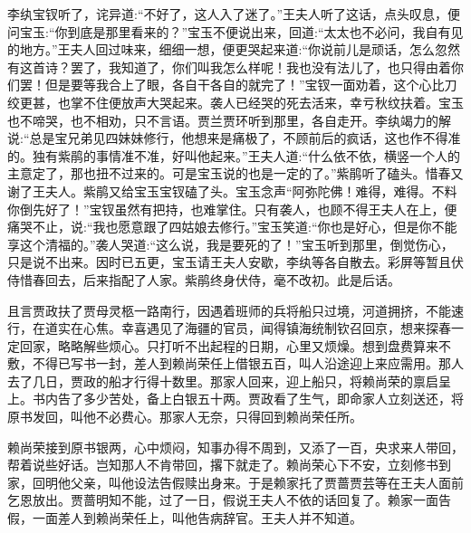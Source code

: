\begin{parag}
    李纨宝钗听了，诧异道:“不好了，这人入了迷了。”王夫人听了这话，点头叹息，便问宝玉:“你到底是那里看来的？”宝玉不便说出来，回道:“太太也不必问，我自有见的地方。”王夫人回过味来，细细一想，便更哭起来道:“你说前儿是顽话，怎么忽然有这首诗？罢了，我知道了，你们叫我怎么样呢！我也没有法儿了，也只得由着你们罢！但是要等我合上了眼，各自干各自的就完了！”宝钗一面劝着，这个心比刀绞更甚，也掌不住便放声大哭起来。袭人已经哭的死去活来，幸亏秋纹扶着。宝玉也不啼哭，也不相劝，只不言语。贾兰贾环听到那里，各自走开。李纨竭力的解说:“总是宝兄弟见四妹妹修行，他想来是痛极了，不顾前后的疯话，这也作不得准的。独有紫鹃的事情准不准，好叫他起来。”王夫人道:“什么依不依，横竖一个人的主意定了，那也扭不过来的。可是宝玉说的也是一定的了。”紫鹃听了磕头。惜春又谢了王夫人。紫鹃又给宝玉宝钗磕了头。宝玉念声“阿弥陀佛！难得，难得。不料你倒先好了！”宝钗虽然有把持，也难掌住。只有袭人，也顾不得王夫人在上，便痛哭不止，说:“我也愿意跟了四姑娘去修行。”宝玉笑道:“你也是好心，但是你不能享这个清福的。”袭人哭道:“这么说，我是要死的了！”宝玉听到那里，倒觉伤心，只是说不出来。因时已五更，宝玉请王夫人安歇，李纨等各自散去。彩屏等暂且伏侍惜春回去，后来指配了人家。紫鹃终身伏侍，毫不改初。此是后话。
\end{parag}


\begin{parag}
    且言贾政扶了贾母灵柩一路南行，因遇着班师的兵将船只过境，河道拥挤，不能速行，在道实在心焦。幸喜遇见了海疆的官员，闻得镇海统制钦召回京，想来探春一定回家，略略解些烦心。只打听不出起程的日期，心里又烦燥。想到盘费算来不敷，不得已写书一封，差人到赖尚荣任上借银五百，叫人沿途迎上来应需用。那人去了几日，贾政的船才行得十数里。那家人回来，迎上船只，将赖尚荣的禀启呈上。书内告了多少苦处，备上白银五十两。贾政看了生气，即命家人立刻送还，将原书发回，叫他不必费心。那家人无奈，只得回到赖尚荣任所。
\end{parag}


\begin{parag}
    赖尚荣接到原书银两，心中烦闷，知事办得不周到，又添了一百，央求来人带回，帮着说些好话。岂知那人不肯带回，撂下就走了。赖尚荣心下不安，立刻修书到家，回明他父亲，叫他设法告假赎出身来。于是赖家托了贾蔷贾芸等在王夫人面前乞恩放出。贾蔷明知不能，过了一日，假说王夫人不依的话回复了。赖家一面告假，一面差人到赖尚荣任上，叫他告病辞官。王夫人并不知道。
\end{parag}


